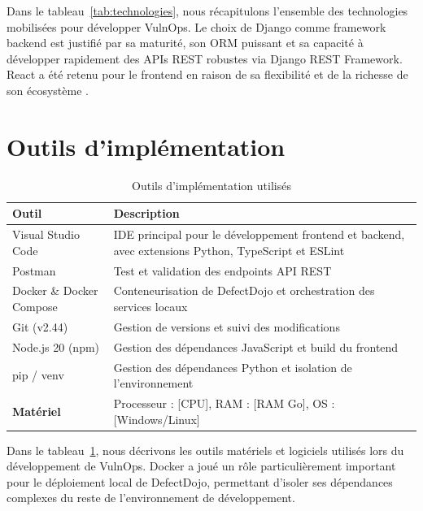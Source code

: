 \documentclass[12pt, a4paper, oneside]{report}
\begin{document}
Dans le tableau~\ref{tab:technologies}, nous récapitulons l'ensemble des
technologies mobilisées pour développer VulnOps. Le choix de Django comme
framework backend est justifié par sa maturité, son ORM puissant et sa capacité
à développer rapidement des APIs REST robustes via Django REST Framework.
React a été retenu pour le frontend en raison de sa flexibilité et de la richesse
de son écosystème \cite{reactdocs}.

\section{Outils d'implémentation}
\label{sec:outils}

\begin{table}[H]
    \centering
    \caption{Outils d'implémentation utilisés}
    \label{tab:outils}
    \begin{tabularx}{\textwidth}{|l|X|}
        \hline
        \textbf{Outil} & \textbf{Description} \\
        \hline
        Visual Studio Code & IDE principal pour le développement frontend et backend,
        avec extensions Python, TypeScript et ESLint \\
        \hline
        Postman & Test et validation des endpoints API REST \\
        \hline
        Docker \& Docker Compose & Conteneurisation de DefectDojo et orchestration
        des services locaux \\
        \hline
        Git (v2.44) & Gestion de versions et suivi des modifications \\
        \hline
        Node.js 20 (npm) & Gestion des dépendances JavaScript et build du frontend \\
        \hline
        pip / venv & Gestion des dépendances Python et isolation de l'environnement \\
        \hline
        \textbf{Matériel} & Processeur : [CPU], RAM : [RAM Go], OS : [Windows/Linux] \\
        \hline
    \end{tabularx}
\end{table}

Dans le tableau~\ref{tab:outils}, nous décrivons les outils matériels et
logiciels utilisés lors du développement de VulnOps. Docker a joué un rôle
particulièrement important pour le déploiement local de DefectDojo, permettant
d'isoler ses dépendances complexes du reste de l'environnement de développement.
\end{document}
